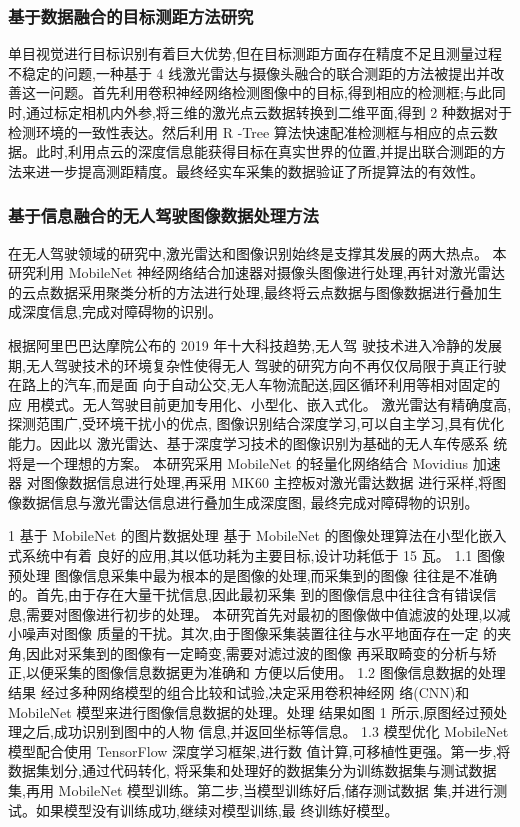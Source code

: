 \message{ !name(\unexpanded{数据融合}.tex)}\documentclass{amsart}
\begin{document}
\subsubsection{基于数据融合的目标测距方法研究}
单目视觉进行目标识别有着巨大优势,但在目标测距方面存在精度不足且测量过程不稳定的问题,一种基于 4 线激光雷达与摄像头融合的联合测距的方法被提出并改善这一问题。首先利用卷积神经网络检测图像中的目标,得到相应的检测框;与此同时,通过标定相机内外参,将三维的激光点云数据转换到二维平面,得到 2 种数据对于检测环境的一致性表达。然后利用 R -Tree 算法快速配准检测框与相应的点云数据。此时,利用点云的深度信息能获得目标在真实世界的位置,并提出联合测距的方法来进一步提高测距精度。最终经实车采集的数据验证了所提算法的有效性。

\subsubsection{基于信息融合的无人驾驶图像数据处理方法}
\cite{戴耀威}在无人驾驶领域的研究中,激光雷达和图像识别始终是支撑其发展的两大热点。
本研究利用 MobileNet 神经网络结合加速器对摄像头图像进行处理,再针对激光雷达的云点数据采用聚类分析的方法进行处理,最终将云点数据与图像数据进行叠加生成深度信息,完成对障碍物的识别。

根据阿里巴巴达摩院公布的 2019 年十大科技趋势,无人驾
驶技术进入冷静的发展期,无人驾驶技术的环境复杂性使得无人
驾驶的研究方向不再仅仅局限于真正行驶在路上的汽车,而是面
向于自动公交,无人车物流配送,园区循环利用等相对固定的应
用模式。无人驾驶目前更加专用化、小型化、嵌入式化。
激光雷达有精确度高,探测范围广,受环境干扰小的优点,
图像识别结合深度学习,可以自主学习,具有优化能力。因此以
激光雷达、基于深度学习技术的图像识别为基础的无人车传感系
统将是一个理想的方案。
本研究采用 MobileNet 的轻量化网络结合 Movidius 加速器
对图像数据信息进行处理,再采用 MK60 主控板对激光雷达数据
进行采样,将图像数据信息与激光雷达信息进行叠加生成深度图,
最终完成对障碍物的识别。


1
基于 MobileNet 的图片数据处理
基于 MobileNet 的图像处理算法在小型化嵌入式系统中有着
良好的应用,其以低功耗为主要目标,设计功耗低于 15 瓦。
1.1 图像预处理
图像信息采集中最为根本的是图像的处理,而采集到的图像
往往是不准确的。首先,由于存在大量干扰信息,因此最初采集
到的图像信息中往往含有错误信息,需要对图像进行初步的处理。
本研究首先对最初的图像做中值滤波的处理,以减小噪声对图像
质量的干扰。其次,由于图像采集装置往往与水平地面存在一定
的夹角,因此对采集到的图像有一定畸变,需要对滤过波的图像
再采取畸变的分析与矫正,以便采集的图像信息数据更为准确和
方便以后使用。
1.2 图像信息数据的处理结果
经过多种网络模型的组合比较和试验,决定采用卷积神经网
络(CNN)和 MobileNet 模型来进行图像信息数据的处理。处理
结果如图 1 所示,原图经过预处理之后,成功识别到图中的人物
信息,并返回坐标等信息。
1.3 模型优化
MobileNet 模型配合使用 TensorFlow 深度学习框架,进行数
值计算,可移植性更强。第一步,将数据集划分,通过代码转化,
将采集和处理好的数据集分为训练数据集与测试数据集,再用
MobileNet 模型训练。第二步,当模型训练好后,储存测试数据
集,并进行测试。如果模型没有训练成功,继续对模型训练,最
终训练好模型。
\end{document}
